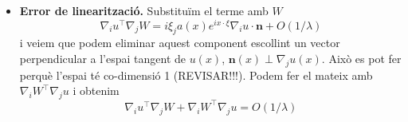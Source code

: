 \documentclass[11pt,a4paper,openright,oneside]{book}
\numberwithin{equation}{section}
\theoremstyle{definition}
\begin{document}
\begin{itemize}

    \item \textbf{Error de linearització.} Substituïm el terme amb $W$
    \begin{equation*}
         \nabla_i u ^{\intercal}\nabla_j W = i\xi_j a(x)e^{ix\cdot\xi}\nabla_i u\cdot\textbf{n}+O(1/\lambda)
    \end{equation*}
    i veiem que podem eliminar aquest component escollint un vector perpendicular a l'espai tangent de $u(x)$, $\textbf{n}(x)\perp \nabla_j u(x)$. Això es pot fer perquè l'espai té co-dimensió 1 ({\color{blue}REVISAR!!!}). Podem fer el mateix amb $\nabla_iW^{\intercal}\nabla_ju$ i obtenim
    \begin{equation*}
        \nabla_i u ^{\intercal}\nabla_j W + \nabla_iW^{\intercal}\nabla_ju = O(1/\lambda)
    \end{equation*}


\end{itemize}
\end{document}
